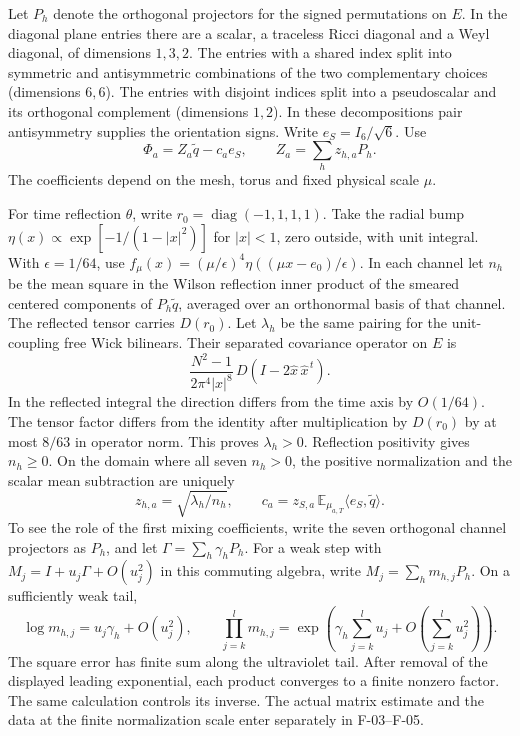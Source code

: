 \documentclass[11pt,letterpaper]{article}
\begin{document}
Let \(P_h\) denote the orthogonal projectors for the signed permutations
on \(E\). In the diagonal plane entries there are a scalar, a traceless
Ricci diagonal and a Weyl diagonal, of dimensions \(1,3,2\). The entries
with a shared index split into symmetric and antisymmetric combinations
of the two complementary choices (dimensions \(6,6\)). The entries with
disjoint indices split into a pseudoscalar and its orthogonal complement
(dimensions \(1,2\)). In these decompositions pair antisymmetry supplies
the orientation signs. Write \(e_S=I_6/\sqrt6\). Use
\[
   \Phi_a=Z_a\widetilde q-c_a e_S,\qquad Z_a=\sum_h z_{h,a}P_h .
\]
The coefficients depend on the mesh, torus and fixed physical scale \(\mu\).

For time reflection \(\theta\), write \(r_0=\operatorname{diag}(-1,1,1,1)\).
Take the radial bump \(\eta(x)\propto\exp[-1/(1-|x|^2)]\) for
\(|x|<1\), zero outside, with unit integral. With \(\epsilon=1/64\), use
\(f_\mu(x)=(\mu/\epsilon)^4\eta((\mu x-e_0)/\epsilon)\). In each channel let \(n_h\) be the mean
square in the Wilson reflection inner product of the smeared centered
components of \(P_h\widetilde q\), averaged over an orthonormal basis of
that channel. The reflected tensor carries \(D(r_0)\). Let \(\lambda_h\)
be the same pairing for the unit-coupling free Wick bilinears. Their
separated covariance operator on \(E\) is
\[
 \frac{N^2-1}{2\pi^4|x|^8}\,D(I-2\widehat x\,\widehat x^{\,t}) .
\]
In the reflected integral the direction differs from the time axis by
\(O(1/64)\). The tensor factor differs from the identity after multiplication
by \(D(r_0)\) by at most \(8/63\) in operator norm. This proves
\(\lambda_h>0\). Reflection positivity gives \(n_h\ge0\).
On the domain where all seven \(n_h>0\), the positive normalization and
the scalar mean subtraction are uniquely
\[
 z_{h,a}=\sqrt{\lambda_h/n_h},\qquad
 c_a=z_{S,a}\,\mathbb E_{\mu_{a,T}}\langle e_S,\widetilde q\rangle.
\]
To see the role of the first mixing coefficients, write the seven
orthogonal channel projectors as \(P_h\), and let
\(\Gamma=\sum_h\gamma_hP_h\). For a weak step with
\(M_j=I+u_j\Gamma+O(u_j^2)\) in this commuting algebra, write
\(M_j=\sum_h m_{h,j}P_h\). On a sufficiently weak tail,
\[
 \log m_{h,j}=u_j\gamma_h+O(u_j^2),\qquad
 \prod_{j=k}^{l}m_{h,j}
 =\exp\!\left(\gamma_h\sum_{j=k}^{l}u_j
                   +O\!\left(\sum_{j=k}^{l}u_j^2\right)\right).
\]
The square error has finite sum along the ultraviolet tail. After removal
of the displayed leading exponential, each product converges to a finite
nonzero factor. The same calculation controls its inverse. The actual
matrix estimate and the data at the finite normalization scale enter
separately in F-03--F-05.
\end{document}
